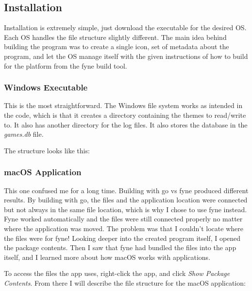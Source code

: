 \documentclass[letterpaper,12pt]{article}
\begin{document}
\subsection{Installation}

Installation is extremely simple, just download the executable for
the desired OS.
Each OS handles the file structure slightly different.
The main idea behind building the program was to create a single
icon, set of metadata about
the program, and let the OS manage itself with the given instructions
of how to build for the platform from the fyne build tool.

\subsubsection{Windows Executable}

This is the most straightforward. The Windows file system works as
intended in the code, which is that it creates a directory containing
the themes to read/write to. It also has another directory for the
log files. It also stores the database in the \textit{games.db} file.

The structure looks like this:


\subsubsection{macOS Application}

This one confused me for a long time.
Building with go vs fyne produced different results.
By building with go, the files and the application location were
connected but not always in the same file location, which is why I
chose to use fyne instead.
Fyne worked automatically and the files were still connected properly
no matter where the application was moved.
The problem was that I couldn't locate where the files were for fyne!
Looking deeper into the created program itself, I opened the package contents.
Then I saw that fyne had bundled the files into the app itself, and I
learned more about how macOS works with applications.

To access the files the app uses, right-click the app, and click
\textit{Show Package Contents}.
From there I will describe the file structure for the macOS application:

\end{document}
